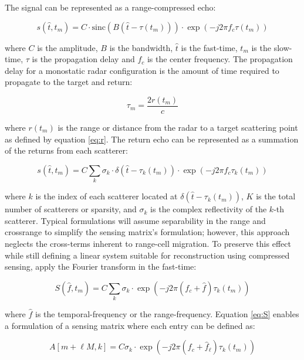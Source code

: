  The signal can be represented as a range-compressed echo:

\begin{equation}
    s(\hat{t},t_{m}) = C \cdot \text{sinc}(B(\hat{t} - \tau(t_{m})))\cdot \exp(-j2 \pi f_{c} \tau(t_{m}))
\end{equation}

\noindent where $C$ is the amplitude, $B$ is the bandwidth, $\hat{t}$ is the fast-time, $t_{m}$ is the slow-time, $\tau$ is the propagation delay and $f_{c}$ is the center frequency. The propagation delay for a monostatic radar configuration is the amount of time required to propagate to the target and return:

\begin{equation}
    \tau_{m} = \frac{2r(t_{m})}{c}
\end{equation}

\noindent where $r(t_{m})$ is the range or distance from the radar to a target scattering point as defined by equation \ref{eq:r}. The return echo can be represented as a summation of the returns from each scatterer:

\begin{equation}
    s(\hat{t},t_{m}) = C \sum_{k} \sigma_{k} \cdot \delta(\hat{t} - \tau_{k}(t_{m})) \cdot \exp(-j2 \pi f_{c} \tau_{k}(t_{m}))
\end{equation}

\noindent where $k$ is the index of each scatterer located at $\delta(\hat{t} - \tau_{k}(t_{m}))$, $K$ is the total number of scatterers or sparsity, and $\sigma_{k}$ is the complex reflectivity of the $k$-th scatterer. Typical formulations will assume separability in the range and crossrange to simplify the sensing matrix's formulation; however, this approach neglects the cross-terms inherent to range-cell migration. To preserve this effect while still defining a linear system suitable for reconstruction using compressed sensing, apply the Fourier transform in the fast-time:

\begin{equation}
    S(\hat{f},t_{m}) = C \sum_{k} \sigma_{k} \cdot \exp(-j2 \pi (f_{c} + \hat{f}) \tau_{k}(t_{m}))
    \label{eq:S}
\end{equation}

\noindent where $\hat{f}$ is the temporal-frequency or the range-frequency. Equation \ref{eq:S} enables a formulation of a sensing matrix where each entry can be defined as:

\begin{equation}
    A[{m + \ell M}, k] = C \sigma_{k} \cdot \exp(-j2 \pi (f_{c} + \hat{f}_{\ell}) \tau_{k}(t_{m}))
\end{equation}

